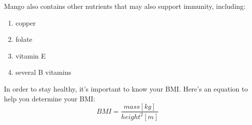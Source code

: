 Mango also contains other nutrients that may also support immunity, including:
\begin{enumerate}
    \item copper
    \item folate
    \item vitamin E
    \item several B vitamins
\end{enumerate}

In order to stay healthy, it's important to know your BMI. Here's an equation to help you determine your BMI: \[BMI = \frac{mass[kg]}{height^2[m]}\]


